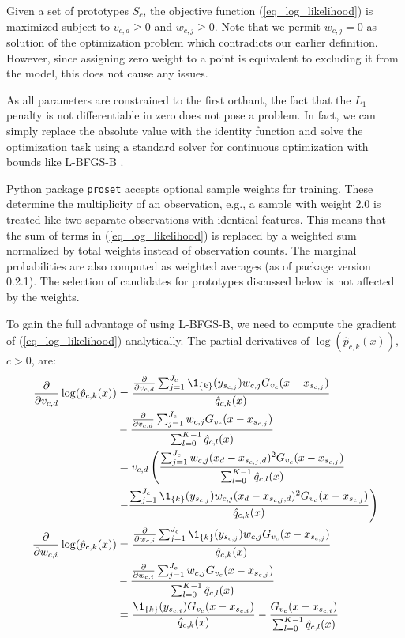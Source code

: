 %
Given a set of prototypes $S_c$, the objective function (\ref{eq_log_likelihood}) is maximized subject to $v_{c,d}\geq0$ and $w_{c,j}\geq0$.
Note that we permit $w_{c,j}=0$ as solution of the optimization problem which contradicts our earlier definition.
However, since assigning zero weight to a point is equivalent to excluding it from the model, this does not cause any issues.\par
%
As all parameters are constrained to the first orthant, the fact that the $L_1$ penalty is not differentiable in zero does not pose a problem.
In fact, we can simply replace the absolute value with the identity function and solve the optimization task using a standard solver for continuous optimization with bounds like L-BFGS-B \cite{Byrd_95}.
%
\begin{remark}
Python package \texttt{proset} accepts optional sample weights for training.
These determine the multiplicity of an observation, e.g., a sample with weight 2.0 is treated like two separate observations with identical features.
This means that the sum of terms in (\ref{eq_log_likelihood}) is replaced by a weighted sum normalized by total weights instead of observation counts.
The marginal probabilities are also computed as weighted averages (as of package version 0.2.1).
The selection of candidates for prototypes discussed below is not affected by the weights.
\end{remark}
%
To gain the full advantage of using L-BFGS-B, we need to compute the gradient of (\ref{eq_log_likelihood}) analytically.
The partial derivatives of $\log(\hat{p}_{c,k}(x))$, $c>0$, are:
%
\begin{align}
\frac{\partial}{\partial v_{c,d}}\log(\hat{p}_{c,k}(x))&
=\frac{\frac{\partial}{\partial v_{c,d}}
\sum_{j=1}^{J_c}\1_{\{k\}}(y_{s_{c,j}})w_{c,j}G_{v_c}(x-x_{s_{c,j}})}
{\hat{q}_{c,k}(x)}
\label{eq_p_partial_v}\\
&-\frac{\frac{\partial}{\partial v_{c,d}}
\sum_{j=1}^{J_c}w_{c,j}G_{v_c}(x-x_{s_{c,j}})}
{\sum_{l=0}^{K-1}\hat{q}_{c,l}(x)}\notag\\
&=v_{c,d}\left(\frac{\sum_{j=1}^{J_c}w_{c,j}
(x_d-x_{s_{c,j},d})^2G_{v_c}(x-x_{s_{c,j}})}
{\sum_{l=0}^{K-1}\hat{q}_{c,l}(x)}\right.\notag\\
&\left.-\frac{\sum_{j=1}^{J_c}\1_{\{k\}}(y_{s_{c,j}})w_{c,j}
(x_d-x_{s_{c,j},d})^2G_{v_c}(x-x_{s_{c,j}})}
{\hat{q}_{c,k}(x)}\right)\notag\\
\frac{\partial}{\partial w_{c,i}}\log(\hat{p}_{c,k}(x))&
=\frac{\frac{\partial}{\partial w_{c,i}}
\sum_{j=1}^{J_c}\1_{\{k\}}(y_{s_{c,j}})w_{c,j}G_{v_c}(x-x_{s_{c,j}})}
{\hat{q}_{c,k}(x)}
\label{eq_p_partial_w}\\
&-\frac{\frac{\partial}{\partial w_{c,i}}
\sum_{j=1}^{J_c}w_{c,j}G_{v_c}(x-x_{s_{c,j}})}
{\sum_{l=0}^{K-1}\hat{q}_{c,l}(x)}\notag\\
&=\frac{\1_{\{k\}}(y_{s_{c,i}})G_{v_c}(x-x_{s_{c,i}})}
{\hat{q}_{c,k}(x)}
-\frac{G_{v_c}(x-x_{s_{c,i}})}
{\sum_{l=0}^{K-1}\hat{q}_{c,l}(x)}\notag
\end{align}
